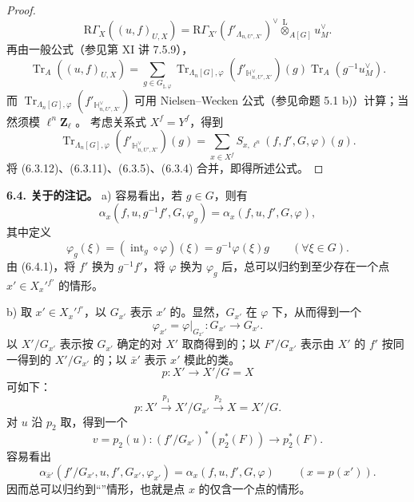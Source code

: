\begin{proof}
\[\mathrm R\Gamma_X((u,f)_{U,X})
=\mathrm R\Gamma_{X'}(f'_{\Lambda_{n,U',X'}})^\vee
 \mathbin{\overset{\mathrm L}{\otimes}}_{A[G]}u_M^\vee.
\tag{6.3.10}
\]
再由一般公式（参见第 XI 讲 7.5.9），
\[
\operatorname{Tr}_A((u,f)_{U,X})
=\sum_{g\in G_{\natural,\varphi}}
 \operatorname{Tr}_{\Lambda_n[G],\varphi}
 (f'_{\mathbb H_{n,U',X'}^\vee})(g)
 \operatorname{Tr}_A(g^{-1}u_M^\vee).
\tag{6.3.11}
\]
而
$\operatorname{Tr}_{\Lambda_n[G],\varphi}(f'_{\mathbb H_{n,U',X'}^\vee})$
可用 Nielsen--Wecken 公式（参见命题 5.1 b)）计算；当然须模 $\ell^n\mathbf Z_\ell$ 。
考虑关系式 $X^f=Y^f$，得到
\[
\operatorname{Tr}_{\Lambda_n[G],\varphi}
 (f'_{\mathbb H_{n,U',X'}^\vee})(g)
=\sum_{x\in X^f}S_{x,\ell^n}(f,f',G,\varphi)(g).
\tag{6.3.12}
\]
将 (6.3.12)、(6.3.11)、(6.3.5)、(6.3.4) 合并，即得所述公式。
\end{proof}

\textbf{6.4. 关于的注记。}
\textup{a)} 容易看出，若 $g\in G$，则有
\[
\alpha_x(f,u,g^{-1}f',G,\varphi_g)
=\alpha_x(f,u,f',G,\varphi),
\tag{6.4.1}
\]
其中定义
\[
\varphi_g(\xi)=(\operatorname{int}_g\circ\varphi)(\xi)
=g^{-1}\varphi(\xi)g\qquad(\forall\xi\in G).
\tag{6.4.2}
\]
由 (6.4.1)，将 $f'$ 换为 $g^{-1}f'$，将 $\varphi$ 换为 $\varphi_g$ 后，总可以归约到至少存在一个点 $x'\in X_x'{}^{f'}$ 的情形。

\textup{b)} 取 $x'\in X_x'{}^{f'}$，以 $G_{x'}$ 表示 $x'$ 的。显然，$G_{x'}$ 在 $\varphi$ 下，从而得到一个
\[
\varphi_{x'}=\varphi|_{G_{x'}}:G_{x'}\longrightarrow G_{x'}.
\]
以 $X'/G_{x'}$ 表示按 $G_{x'}$ 确定的对 $X'$ 取商得到的；以 $F'/G_{x'}$ 表示由 $X'$ 的 $f'$ 按同一得到的 $X'/G_{x'}$ 的；以 $\bar x'$ 表示 $x'$ 模此的类。
\[
p:X'\longrightarrow X'/G=X
\]
可如下：
\[
p:X'\xrightarrow{p_1}X'/G_{x'}\xrightarrow{p_2}X=X'/G.
\]
对 $u$ 沿 $p_2$ 取，得到一个
\[
v=p_2(u):(f'/G_{x'})^*(p_2^*(F))\longrightarrow p_2^*(F).
\]
容易看出
\[
\alpha_{\bar x'}(f'/G_{x'},u,f',G_{x'},\varphi_{x'})
=\alpha_x(f,u,f',G,\varphi)\qquad(x=p(x')).
\tag{6.4.3}
\]
因而总可以归约到“”情形，也就是点 $x$ 的仅含一个点的情形。

